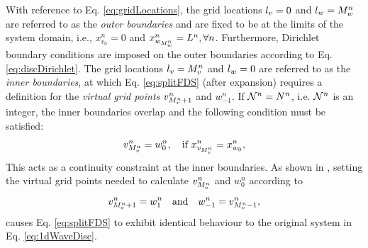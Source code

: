\documentclass[fleqn]{jaes}
\def\SBcomment[#1]{\textcolor{red}{#1}}
\def\SWcomment[#1]{\textcolor{blue}{#1}}
\begin{document}
With reference to Eq. \eqref{eq:gridLocations}, the grid locations ${l_v} = 0$ and ${l_w} = M_w^n$ are referred to as the \textit{outer boundaries} and are fixed to be at the limits of the system domain, i.e., $x_{v_0}^n = 0$ and $x_{w_{M_w^n}}^n = L^n, \forall n$. Furthermore, Dirichlet boundary conditions are imposed on the outer boundaries according to Eq. \eqref{eq:discDirichlet}. 
The grid locations ${l_v} = M_v^n$ and ${l_w} = 0$  are referred to as the \textit{inner boundaries}, at which Eq. \eqref{eq:splitFDS} (after expansion) requires a definition for the \textit{virtual grid points} $v_{M_v^n+1}^n$ and $w_{-1}^n$. If $\mathcal{N}^n = N^n$, i.e. $\mathcal{N}^n$ is an integer, the inner boundaries overlap and the following condition must be satisfied:
\begin{equation}\label{eq:rigid}
    v_{\Mv}^n = w_0^n, \quad \text{if}\  x_{v_{\Mv}}^n =  x_{w_0}^n,
\end{equation}
This acts as a continuity constraint at the inner boundaries. As shown in
\cite{Willemsen2021a}, setting 
the virtual grid points needed to calculate $v_{M_v^n}^n$ and $w_0^n$ according to
\begin{equation}\label{eq:perfectOverlap}
    v_{\Mv+1}^n = w_1^n \qaq w_{-1}^n = v_{\Mv-1}^n,
\end{equation}
causes Eq. \eqref{eq:splitFDS} to exhibit identical behaviour to the original system in Eq. \eqref{eq:1dWaveDisc}.
\end{document}
